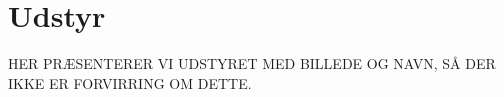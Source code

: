 \section{Udstyr}

HER PRÆSENTERER VI UDSTYRET MED BILLEDE OG NAVN, SÅ DER IKKE ER FORVIRRING OM DETTE.